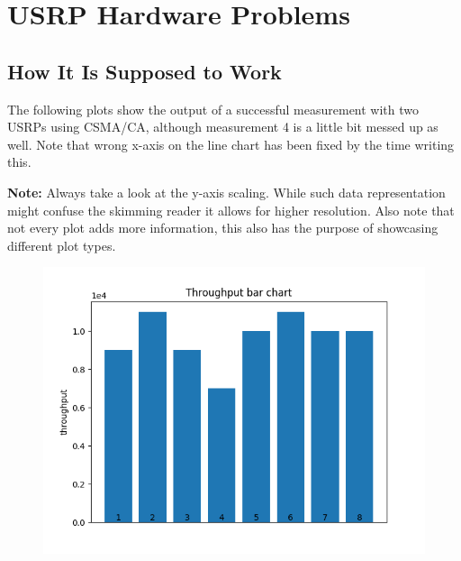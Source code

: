 \documentclass{article}
\begin{document}
\section{USRP Hardware Problems} 

\subsection{How It Is Supposed to Work}

The following plots show the output of a successful measurement with two USRPs using CSMA/CA, although measurement 4 is a little bit messed up as well. Note that wrong x-axis on the line chart has been fixed by the time writing this.

\bigskip

\textbf{Note:} Always take a look at the y-axis scaling. While such data representation might confuse the skimming reader it allows for higher resolution. Also note that not every plot adds more information, this also has the purpose of showcasing different plot types.

\begin{figure}[h] \label{usrp-success-1}
	\includegraphics[width=\textwidth]{usrp_success_tp_bar}	
\end{figure}
\end{document}
